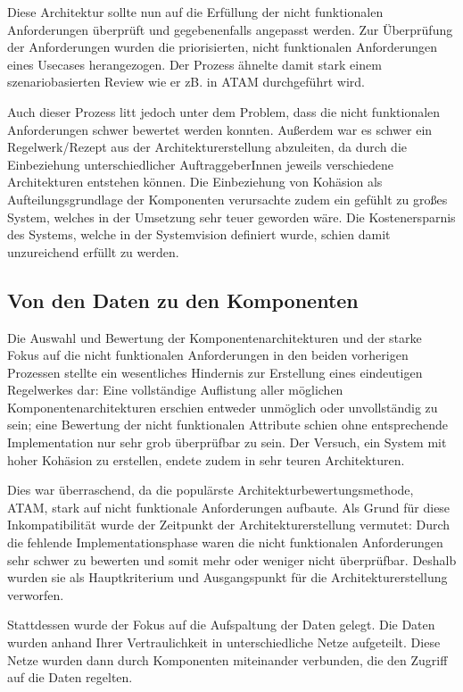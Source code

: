 Diese Architektur sollte nun auf die Erfüllung der nicht funktionalen Anforderungen überprüft und gegebenenfalls angepasst werden. Zur Überprüfung der Anforderungen wurden die priorisierten, nicht funktionalen Anforderungen eines Usecases herangezogen. Der Prozess ähnelte damit stark einem szenariobasierten Review wie er zB. in ATAM durchgeführt wird.

Auch dieser Prozess litt jedoch unter dem Problem, dass die nicht funktionalen Anforderungen schwer bewertet werden konnten. Außerdem war es schwer ein Regelwerk/Rezept aus der Architekturerstellung abzuleiten, da durch die Einbeziehung unterschiedlicher AuftraggeberInnen jeweils verschiedene Architekturen entstehen können. Die Einbeziehung von Kohäsion als Aufteilungsgrundlage der Komponenten verursachte zudem ein gefühlt zu großes System, welches in der Umsetzung sehr teuer geworden wäre. Die Kostenersparnis des Systems, welche in der Systemvision definiert wurde, schien damit unzureichend erfüllt zu werden.

\subsection{Von den Daten zu den Komponenten}
Die Auswahl und Bewertung der Komponentenarchitekturen und der starke Fokus auf die nicht funktionalen Anforderungen in den beiden vorherigen Prozessen stellte ein wesentliches Hindernis zur Erstellung eines eindeutigen Regelwerkes dar: Eine vollständige Auflistung aller möglichen Komponentenarchitekturen erschien entweder unmöglich oder unvollständig zu sein; eine Bewertung der nicht funktionalen Attribute schien ohne entsprechende Implementation nur sehr grob überprüfbar zu sein. Der Versuch, ein System mit hoher Kohäsion zu erstellen, endete zudem in sehr teuren Architekturen.

Dies war überraschend, da die populärste Architekturbewertungsmethode, ATAM, stark auf nicht funktionale Anforderungen aufbaute. Als Grund für diese Inkompatibilität wurde der Zeitpunkt der Architekturerstellung vermutet: Durch die fehlende Implementationsphase waren die nicht funktionalen Anforderungen sehr schwer zu bewerten und somit mehr oder weniger nicht überprüfbar. Deshalb wurden sie als Hauptkriterium und Ausgangspunkt für die Architekturerstellung verworfen.

Stattdessen wurde der Fokus auf die Aufspaltung der Daten gelegt. Die Daten wurden anhand Ihrer Vertraulichkeit in unterschiedliche Netze aufgeteilt. Diese Netze wurden dann durch Komponenten miteinander verbunden, die den Zugriff auf die Daten regelten.

